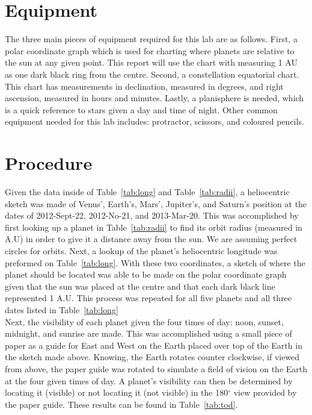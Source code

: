 \documentclass{article}
\begin{document}

\section{Equipment}

The three main pieces of equipment required for this lab are as follows. First, a polar coordinate graph which is used for
charting where planets are relative to the sun at any given point. This report will use the chart with measuring 1 AU as 
one dark black ring from the centre. Second, a constellation equatorial chart. This chart has measurements in declination, 
measured in degrees, and right ascension, measured in hours and minutes. Lastly, a planisphere is needed, which is a
quick reference to stars given a day and time of night. Other common equipment needed for this lab includes: protractor,
scissors, and coloured pencils.




\section{Procedure}

Given the data inside of Table~\ref{tab:long} and Table~\ref{tab:radii}, a heliocentric sketch was made of Venus', Earth's, Mars', 
Jupiter's, and Saturn's position at the dates of 2012-Sept-22, 2012-No-21, and 2013-Mar-20. This was accomplished by first
looking up a planet in Table~\ref{tab:radii} to find its orbit radius (measured in A.U) in order to give it a distance away from the
sun. We are assuming perfect circles for orbits. Next, a lookup of the planet's heliocentric longitude was preformed on 
Table~\ref{tab:long}. With these two coordinates, a sketch of where the planet should be located was able to be made on the 
polar coordinate graph given that the sun was placed at the centre and that each dark black line represented 1 A.U. This process
was repeated for all five planets and all three dates listed in Table~\ref{tab:long}\\

Next, the visibility of each planet given the four times of day: noon, sunset, midnight, and sunrise are made. This was accomplished
using a small piece of paper as a guide for East and West on the Earth placed over top of the Earth in the sketch made above. Knowing,
the Earth rotates counter clockwise, if viewed from above, the paper guide was rotated to simulate a field of vision on the Earth at
the four given times of day. A planet's visibility can then be determined by locating it (visible) or not locating it (not visible) in the
180$^\circ$ view provided by the paper guide. These results can be found in Table~\ref{tab:tod}.\\
\end{document}

